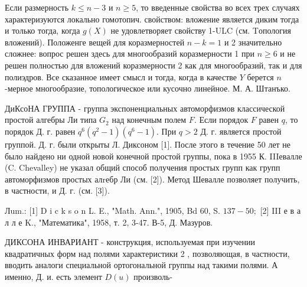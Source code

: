 \documentclass[10pt]{article}
\begin{document}
Если размерность $k \leqslant n-3$ и $n \geqslant 5$, то введенные свойства во всех трех случаях характеризуются локально гомотопич. свойством: вложение является диким тогда и только тогда, когда $g(X)$ не удовлетворяет свойству 1-ULC (см. Tопология вложений). Положенге вещей для коразмерностей $n-k=1$ и 2 значительно сложнее: вопрос решен здесь для многообразий коразмерности 1 при $n \geqslant 6$ и не решен полностью для вложений коразмерности 2 как для многообразий, так и для полиэдров. Все сказанное имеет смысл и тогда, когда в качестве $Y$ берется $n$-мерное многообразие, топологическое или кусочно линейное. М. А. Штанъко.



ДиКсоНА ГРУППА - группа экспоненциальных автоморфизмов классической простой алгебры Ли типа $G_{2}$ над конечным полем $F$. Если порядок $F$ равен $q$, то порядок Д. г. равен $q^{6}\left(q^{2}-1\right)\left(q^{6}-1\right)$. При $q>2$ Д. г. является простой группой. Д. г. были открыты Л. Диксоном [1]. После этого в течение 50 лет не было найдено ни одной новой конечной простой группы, пока в 1955 К. IIIевалле (C. Chevalley) не указал общий способ получения простых групп как групп автоморфизмов простых алrебр Ли (см. [2]). Метод Шевалле позволяет получить, в частности, и Д. г. (см. [3]).



Лum.: [1] D i c k s o n L. E., "Math. Ann.", 1905, Bd 60, S. $137-50 ;$ [2] III е в а л л е K., "Математика", 1958, т. 2, 3-47. В-5, Д. Мазуров.



ДИКСОНА ИНВАРИАНТ - конструкция, используемая при изучении квадратичных форм над полями характеристики 2 , позволяющая, в частности, вводить аналоги специальной ортогональной группы над такими полями. А именно, Д. и. есть элемент $D(u)$ произволь-
\end{document}
